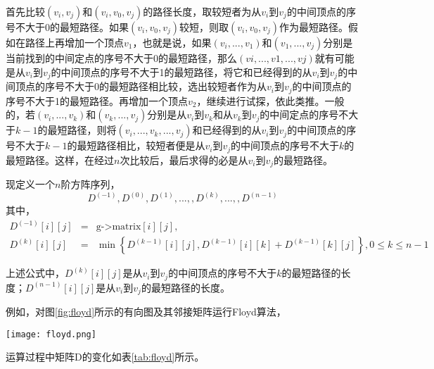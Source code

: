首先比较$(v_i,v_j)$和$(v_i,v_0,v_j)$的路径长度，取较短者为从$v_i$到$v_j$的中间顶点的序号不大于0的最短路径。如果$(v_i,v_0,v_j)$较短，则取$(v_i,v_0,v_j)$作为最短路径。假如在路径上再增加一个顶点$v_1$，也就是说，如果$(v_i,...,v_1)$和$(v_1,...,v_j)$分别是当前找到的中间定点的序号不大于0的最短路径，那么$(vi,...,v1,...,vj)$就有可能是从$v_i$到$v_j$的中间顶点的序号不大于1的最短路径，将它和已经得到的从$v_i$到$v_j$的中间顶点的序号不大于0的最短路径相比较，选出较短者作为从$v_i$到$v_j$的中间顶点的序号不大于1的最短路径。再增加一个顶点$v_2$，继续进行试探，依此类推。一般的，若$(v_i,...,v_k)$和$(v_k,...,v_j)$分别是从$v_i$到$v_k$和从$v_k$到$v_j$的中间定点的序号不大于$k-1$的最短路径，则将$(v_i,...,v_k,...,v_j)$和已经得到的从$v_i$到$v_j$的中间顶点的序号不大于$k-1$的最短路径相比，较短者便是从$v_i$到$v_j$的中间顶点的序号不大于$k$的最短路径。这样，在经过$n$次比较后，最后求得的必是从$v_i$到$v_j$的最短路径。

现定义一个$n$阶方阵序列，
$$
D^{(-1)}, D^{(0)} , D^{(1)},..., , D^{(k)},..., , D^{(n-1)}
$$
其中，
\begin{eqnarray}
D^{(-1)}[i][j] &=& \text{g->matrix}[i][j],  \nonumber \\
D^{(k)}[i][j] &=& \min\left\{D^{(k-1)}[i][j], D^{(k-1)}[i][k] + D^{(k-1)}[k][j]\right\},0 \leq k \leq n-1 \nonumber
\end{eqnarray}

上述公式中，$D^{(k)}[i][j]$是从$v_i$到$v_j$的中间顶点的序号不大于$k$的最短路径的长度；$D^{(n-1)}[i][j]$是从$v_i$到$v_j$的最短路径的长度。

例如，对图\ref{fig:floyd}所示的有向图及其邻接矩阵运行Floyd算法，

\begin{center}
\texttt{[image: floyd.png]}\\
\label{fig:floyd}
\end{center}

运算过程中矩阵D的变化如表\ref{tab:floyd}所示。


